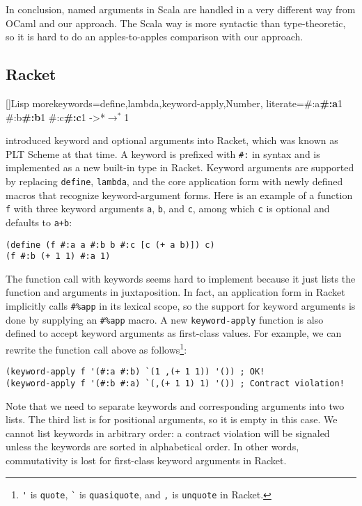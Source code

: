 In conclusion, named arguments in Scala are handled in a very different way from
OCaml and our approach. The Scala way is more syntactic than type-theoretic, so
it is hard to do an apples-to-apples comparison with our approach.

\subsection{Racket}

[]{Lisp}{
  morekeywords={define,lambda,keyword-apply,Number},
  literate={\#:a}{{\textbf{\color{darkgray}\#:a}}}1 {\#:b}{{\textbf{\color{darkgray}\#:b}}}1 {\#:c}{{\textbf{\color{darkgray}\#:c}}}1
           {->*}{{$\rightarrow^*$}}1
}

\citet{flatt2009keyword} introduced keyword and optional arguments into Racket,
which was known as PLT Scheme at that time. A keyword is prefixed with
{\color{gray}\lstinline{#:}} in syntax and is implemented as a new built-in type
in Racket. Keyword arguments are supported by replacing
\lstinline[language=Racket]{define}, \lstinline[language=Racket]{lambda}, and
the core application form with newly defined macros that recognize
keyword-argument forms. Here is an example of a function \lstinline{f} with
three keyword arguments \lstinline{a}, \lstinline{b}, and \lstinline{c}, among
which \lstinline{c} is optional and defaults to \lstinline{a+b}:
\begin{lstlisting}[language=Racket]
(define (f #:a a #:b b #:c [c (+ a b)]) c)
(f #:b (+ 1 1) #:a 1)
\end{lstlisting}
The function call with keywords seems hard to implement because it just lists
the function and arguments in juxtaposition. In fact, an application form in
Racket implicitly calls \lstinline{#%app} in its lexical scope, so the support
for keyword arguments is done by supplying an \lstinline{#%app} macro. A new
\lstinline[language=Racket]{keyword-apply} function is also defined to accept
keyword arguments as first-class values. For example, we can rewrite the
function call above as follows\footnote{\lstinline[language=Racket]{'} is
\lstinline{quote}, \lstinline[language=Racket]{`} is \lstinline{quasiquote}, and
\lstinline[language=Racket]{,} is \lstinline{unquote} in Racket.}:
\begin{lstlisting}[language=Racket]
(keyword-apply f '(#:a #:b) `(1 ,(+ 1 1)) '()) ; OK!
(keyword-apply f '(#:b #:a) `(,(+ 1 1) 1) '()) ; Contract violation!
\end{lstlisting}
Note that we need to separate keywords and corresponding arguments into two
lists. The third list is for positional arguments, so it is empty in this case.
We cannot list keywords in arbitrary order: a contract violation will be
signaled unless the keywords are sorted in alphabetical order. In other words,
commutativity is lost for first-class keyword arguments in Racket.

